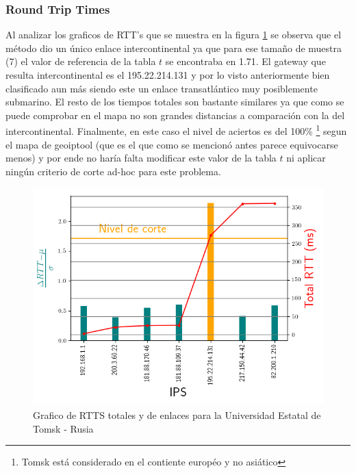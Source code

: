 \subsubsection{Round Trip Times}

Al analizar los graficos de RTT's que se muestra en la figura
\ref{fig:rtts_tsu} se observa que el método dio un único enlace
intercontinental ya que para ese tamaño de muestra (7) el valor de referencia
de la tabla $t$ se encontraba en 1.71. El gateway que resulta intercontinental
es el 195.22.214.131 y por lo visto anteriormente bien clasificado aun más
siendo este un enlace transatlántico muy posiblemente submarino. El resto de los
tiempos totales son bastante similares ya que como se puede comprobar en el mapa
no son grandes distancias a comparación con la del intercontinental. Finalmente, 
en este caso el nivel de aciertos es del 100\% \footnote{Tomsk está considerado
en el contiente européo y no asiático} segun el mapa de geoiptool (que es el que como se mencionó
antes parece equivocarse menos) y por ende no haría falta modificar este valor de
la tabla $t$ ni aplicar ningún criterio de corte ad-hoc para este problema.

\begin{figure}[ht]\label{fig:rtts_tsu}
	\begin{center}
		\includegraphics[width=0.8\columnwidth]{imagenes/rtts_tsu.png}
		\caption{Grafico de RTTS totales y de enlaces para la Universidad Estatal de Tomsk - Rusia}
	\end{center}
\end{figure}
